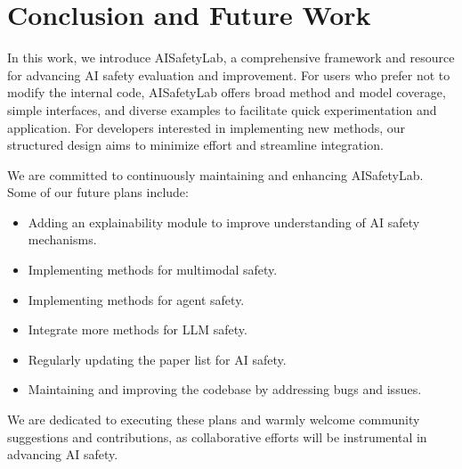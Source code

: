 \section{Conclusion and Future Work}
In this work, we introduce AISafetyLab, a comprehensive framework and resource for advancing AI safety evaluation and improvement. For users who prefer not to modify the internal code, AISafetyLab offers broad method and model coverage, simple interfaces, and diverse examples to facilitate quick experimentation and application. For developers interested in implementing new methods, our structured design aims to minimize effort and streamline integration.

We are committed to continuously maintaining and enhancing AISafetyLab. Some of our future plans include: \begin{itemize}
    \item Adding an explainability module to improve understanding of AI safety mechanisms.
    \item Implementing methods for multimodal safety.
    \item Implementing methods for agent safety.
    \item Integrate more methods for LLM safety. 
    \item Regularly updating the paper list for AI safety.
    \item Maintaining and improving the codebase by addressing bugs and issues.
    
\end{itemize}
We are dedicated to executing these plans and warmly welcome community suggestions and contributions, as collaborative efforts will be instrumental in advancing AI safety.